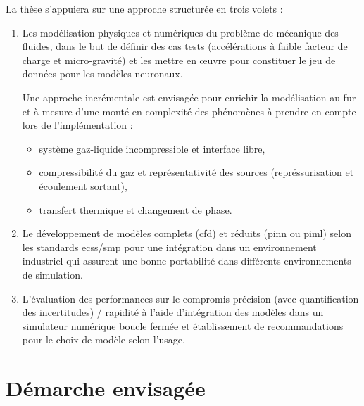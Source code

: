 \documentclass[12pt]{article}
\begin{document}
	La thèse s’appuiera sur une approche structurée en trois volets :
	\begin{enumerate}
		\item Les modélisation physiques et numériques du problème de mécanique des fluides, dans le but de définir des cas tests (accélérations à faible facteur de charge et micro-gravité) et les mettre en œuvre pour constituer le jeu de données pour les modèles neuronaux.
		
		Une approche incrémentale est envisagée pour enrichir la modélisation au fur et à mesure d'une monté en complexité des phénomènes à prendre en compte lors de l'implémentation :
		\begin{itemize}
			\item système gaz-liquide incompressible et interface libre,
			\item compressibilité du gaz et représentativité des sources (représsurisation et écoulement sortant),
			\item transfert thermique et changement de phase.
		\end{itemize}
		
		\item Le développement de modèles complets (\acrshort{cfd}) et réduits (\gls{pinn} ou \acrshort{piml}) selon les standards \acrshort{ecss}/\acrshort{smp} pour une intégration dans un environnement industriel qui assurent une bonne portabilité dans différents environnements de simulation.
		
		\item L'évaluation des performances sur le compromis précision (avec quantification des incertitudes) / rapidité à l'aide d'intégration des modèles dans un simulateur numérique boucle fermée et établissement de recommandations pour le choix de modèle selon l'usage.	
		
	\end{enumerate}
	
	\section*{Démarche envisagée}
	
\end{document}
